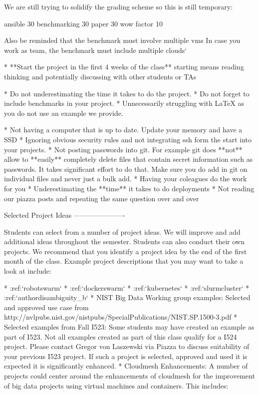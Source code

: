 We are still trying to solidify the grading scheme so this is still temporary:
 
ansible 30%
benchmarking 30%
paper 30%
wow factor 10%
 
Also be reminded that the benchmark must involve multiple vms
In case you work as team, the benchmark must include multiple clouds`


* **Start the project in the first 4 weeks of the class**
starting means reading thinking and potentially discussing with other students or TAs

* Do not underestimating the time it takes to do the project.
* Do not forget to include benchmarks in your project.
* Unnecessarily struggling with LaTeX as you do not use an example we
  provide.

* Not having a computer that is up to date. Update your memory and
  have a SSD
* Ignoring obvious security rules and not integrating ssh form the
  start into your projects.
* Not posting passwords into git. For example git does
  **not** allow to **easily** completely delete files that contain secret
  information such as passwords. It takes significant effort to do
  that. Make sure you do add in git on individual files and never
  just a bulk add.
* Having your coleagues do the work for you
* Underestimating the **time** it takes to do deployments
* Not reading our piazza posts and repeating the same question over
  and over

Selected Project Ideas
----------------------
	   
Students can select from a number of project ideas. We will improve
and add additional ideas throughout the semester. Students can also
conduct their own projects. We recommend that you identify a project
idea by the end of the first month of the class. Example project
descriptions that you may want to take a look at include:

* :ref:`robotswarm`
* :ref:`dockerswarm`
* :ref:`kubernetes`
* :ref:`slurmcluster`
* :ref:`authordisambiguity_b`
* NIST Big Data Working group examples: Selected and approved use case from
  http://nvlpubs.nist.gov/nistpubs/SpecialPublications/NIST.SP.1500-3.pdf
* Selected examples from Fall I523:
  Some students may have created an example as part of I523. Not all
  examples created as part of this class qualify for a I524
  project. Please contact Gregor von Laszewski via Piazza to discuss
  suitability of your previous I523 project. If such a project is
  selected, approved and used it is expected it is significantly
  enhanced.
* Cloudmesh Enhancements:
  A number of projects could center around the enhancements of
  cloudmesh for the improvement of big data projects using virtual
  machines and containers. This includes:

